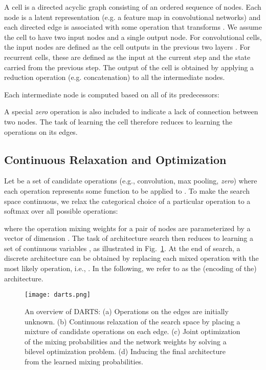 \documentclass{article}
\begin{document}
A cell is a directed acyclic graph consisting of an ordered sequence of  nodes.
Each node  is a latent representation (e.g. a feature map in convolutional networks) and each directed
edge  is associated with some operation 
that transforms .
We assume the cell to have two input nodes and a single output node.
For convolutional cells,
the input nodes are defined as the cell outputs in the previous two layers \citep{zoph2017learning}.
For recurrent cells,
these are defined as the input at the current step and the state carried from the previous step.
The output of the cell is obtained by applying a reduction operation
(e.g. concatenation) to all the intermediate nodes.

Each intermediate node is computed based on all of its predecessors:

A special \emph{zero} operation is also included to indicate a lack of connection
between two nodes.
The task of learning the cell therefore reduces to learning
the operations on its edges.

\subsection{Continuous Relaxation and Optimization}
\label{sec:sec:relaxation-and-optimization}
Let  be a set of candidate operations (e.g., convolution, max pooling, \emph{zero})
where each operation represents some function  to be applied to .
To make the search space continuous,
we relax the categorical choice of a particular operation to a softmax over all possible operations:

where the operation mixing weights for a pair of nodes  are parameterized by a vector  of dimension .
The task of architecture search then
reduces to learning a set of continuous variables , as illustrated in Fig.~\ref{fig:darts}.
At the end of search,
a discrete architecture can be obtained by replacing each mixed operation  with the most likely operation, i.e.,
.
In the following, we refer to  as the (encoding of the) architecture.

\begin{figure}
	\centering
	\texttt{[image: darts.png]}
	\caption{An overview of DARTS:
		(a) Operations on the edges are initially unknown. 
		(b) Continuous relaxation of the search space by placing a mixture of candidate operations on each edge.
		(c) Joint optimization of the mixing probabilities and the network weights by solving a bilevel optimization problem.
		(d) Inducing the final architecture from the learned mixing probabilities.}
\label{fig:darts}
\end{figure}
\end{document}
